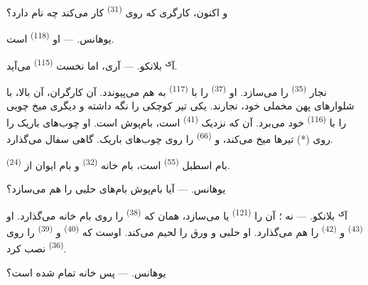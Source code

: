 و اکنون، کارگری که روی  \textsuperscript{(31)} کار می‌کند
چه نام دارد؟

\textsc{یوهانس}. --- او  \textsuperscript{(118)} است.

\VUsaut{3.0mm}
\VUsaut{3.0mm}

آ\textsuperscript{ی} \textsc{بلانکو}. --- آری، اما نخست 
\textsuperscript{(115)} می‌آید.

نجار  \textsuperscript{(35)} را می‌سازد. او 
\textsuperscript{(37)} را با  \textsuperscript{(117)} به
هم می‌پیوندد. آن کارگران، آن بالا، با شلوارهای پهن مخملی خود، نجارند.
یکی تیر کوچکی را نگه داشته و دیگری میخ چوبی را با 
\textsuperscript{(116)} خود می‌برد. آن که نزدیک 
\textsuperscript{(41)} است، بام‌پوش است. او چوب‌های باریک را روی (*)
تیرها میخ می‌کند، و  \textsuperscript{(66)} را روی
چوب‌های باریک. گاهی سفال می‌گذارد.


بام اسطبل  \textsuperscript{(55)} است، بام خانه
 \textsuperscript{(32)} و بام ایوان از 
\textsuperscript{(24)}.

\textsc{یوهانس}. --- آیا بام‌پوش بام‌های حلبی را هم می‌سازد؟

آ\textsuperscript{ی} \textsc{بلانکو}. --- نه ؛ آن را 
\textsuperscript{(121)} یا  می‌سازد، همان که
 \textsuperscript{(38)} را روی بام خانه می‌گذارد. او
 \textsuperscript{(43)} و 
\textsuperscript{(42)} را هم می‌گذارد. او حلبی و ورق را لحیم می‌کند.
اوست که  \textsuperscript{(40)} و 
\textsuperscript{(39)} را روی  \textsuperscript{(36)}
نصب کرد.

\textsc{یوهانس}. --- پس خانه تمام شده است؟

\VUsaut{3.0mm}
\VUsaut{3.0mm}

